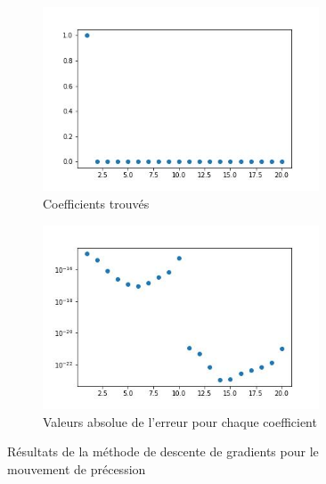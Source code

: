 \documentclass[12pt]{report}
\begin{document}
\begin{figure}
    \centering
    \begin{subfigure}[b]{0.4\textwidth}
        \centering
        \includegraphics[width=0.9\textwidth, height=0.9\textwidth]{coefs_2_DG.jpg}
        \caption{Coefficients trouvés}
    \end{subfigure}
    \hfill
    \begin{subfigure}[b]{0.4\textwidth}
        \centering
        \includegraphics[width=0.9\textwidth, height=0.9\textwidth]{coefs_2_DG_erreur.jpg}
        \caption{Valeurs absolue de l'erreur pour chaque coefficient}
    \end{subfigure}
       \caption{Résultats de la méthode de descente de gradients pour le mouvement de précession}
       \label{fig:résultats 2 DG}
\end{figure}
\end{document}
